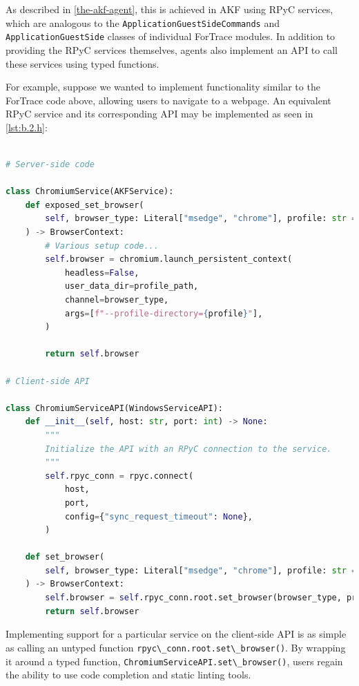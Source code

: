 \documentclass[letterpaper,12pt]{report}
\newcommand{\passthrough}[1]{#1}
\begin{document}
As described in \autoref{the-akf-agent}, this is achieved in AKF using RPyC services, which are analogous
to the \passthrough{\lstinline!ApplicationGuestSideCommands!} and
\passthrough{\lstinline!ApplicationGuestSide!} classes of individual
ForTrace modules. In addition to providing the RPyC services themselves,
agents also implement an API to call these services using typed
functions.

For example, suppose we wanted to implement functionality similar to the
ForTrace code above, allowing users to navigate to a webpage. An
equivalent RPyC service and its corresponding API may be implemented as
seen in \autoref{lst:b.2.h}:

\begin{lstlisting}[label={lst:b.2.h}, caption={Minimal reimplementation of ForTrace module as an RPyC service}, language=Python]

# Server-side code

class ChromiumService(AKFService):
    def exposed_set_browser(
        self, browser_type: Literal["msedge", "chrome"], profile: str = "Default"
    ) -> BrowserContext:
        # Various setup code...
        self.browser = chromium.launch_persistent_context(
            headless=False,
            user_data_dir=profile_path,
            channel=browser_type,
            args=[f"--profile-directory={profile}"],
        )

        return self.browser

# Client-side API

class ChromiumServiceAPI(WindowsServiceAPI):
    def __init__(self, host: str, port: int) -> None:
        """
        Initialize the API with an RPyC connection to the service.
        """
        self.rpyc_conn = rpyc.connect(
            host,
            port,
            config={"sync_request_timeout": None},
        )

    def set_browser(
        self, browser_type: Literal["msedge", "chrome"], profile: str = "Default"
    ) -> BrowserContext:
        self.browser = self.rpyc_conn.root.set_browser(browser_type, profile)
        return self.browser
\end{lstlisting}

Implementing support for a particular service on the client-side API is
as simple as calling an untyped function
\passthrough{\lstinline!rpyc\_conn.root.set\_browser()!}. By wrapping it
around a typed function,
\passthrough{\lstinline!ChromiumServiceAPI.set\_browser()!}, users
regain the ability to use code completion and static linting tools.
\end{document}

